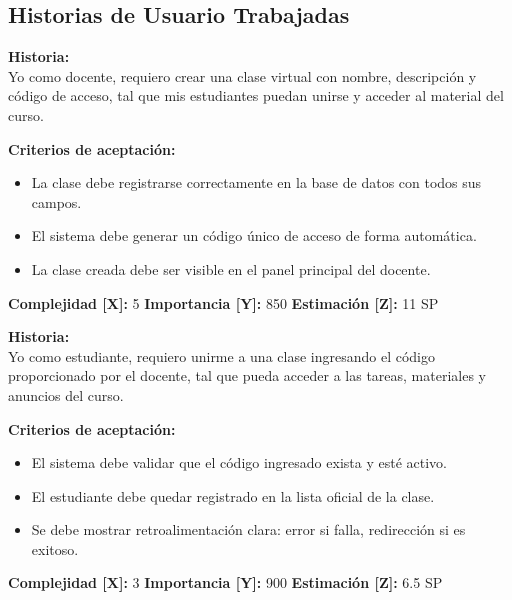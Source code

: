 \documentclass[12pt,a4paper]{article}
\begin{document}

\subsection{Historias de Usuario Trabajadas}

\begin{tcolorbox}[title=\textbf{HU-S1-01: Crear una clase virtual}]
\textbf{Historia:} \\
Yo como docente, requiero crear una clase virtual con nombre, descripción y código de acceso, tal que mis estudiantes puedan unirse y acceder al material del curso.

\vspace{0.5em}
\textbf{Criterios de aceptación:}
\begin{itemize}
    \item La clase debe registrarse correctamente en la base de datos con todos sus campos.
    \item El sistema debe generar un código único de acceso de forma automática.
    \item La clase creada debe ser visible en el panel principal del docente.
\end{itemize}
\textbf{Complejidad [X]:} 5 \hfill \textbf{Importancia [Y]:} 850 \hfill \textbf{Estimación [Z]:} 11 SP
\end{tcolorbox}

\vspace{0.5em}

\begin{tcolorbox}[title=\textbf{HU-S1-02: Unirse a una clase mediante código de acceso}]
\textbf{Historia:} \\
Yo como estudiante, requiero unirme a una clase ingresando el código proporcionado por el docente, tal que pueda acceder a las tareas, materiales y anuncios del curso.

\vspace{0.5em}
\textbf{Criterios de aceptación:}
\begin{itemize}
    \item El sistema debe validar que el código ingresado exista y esté activo.
    \item El estudiante debe quedar registrado en la lista oficial de la clase.
    \item Se debe mostrar retroalimentación clara: error si falla, redirección si es exitoso.
\end{itemize}
\textbf{Complejidad [X]:} 3 \hfill \textbf{Importancia [Y]:} 900 \hfill \textbf{Estimación [Z]:} 6.5 SP
\end{tcolorbox}
\end{document}
